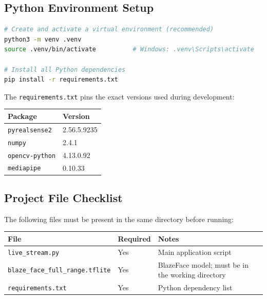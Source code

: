 \documentclass[12pt, a4paper]{article}
\newcommand{\code}[1]{\texttt{\small#1}}
\begin{document}
\subsection{Python Environment Setup}

\begin{lstlisting}[language=sh, caption={Create environment and install dependencies}]
# Create and activate a virtual environment (recommended)
python3 -m venv .venv
source .venv/bin/activate          # Windows: .venv\Scripts\activate

# Install all Python dependencies
pip install -r requirements.txt
\end{lstlisting}

The \code{requirements.txt} pins the exact versions used during development:

\begin{center}
\begin{tabular}{ll}
  \toprule
  \textbf{Package} & \textbf{Version} \\
  \midrule
  \code{pyrealsense2}  & 2.56.5.9235 \\
  \code{numpy}         & 2.4.1 \\
  \code{opencv-python} & 4.13.0.92 \\
  \code{mediapipe}     & 0.10.33 \\
  \bottomrule
\end{tabular}
\end{center}

\subsection{Project File Checklist}

The following files must be present in the same directory before running:

\begin{center}
\begin{tabular}{lll}
  \toprule
  \textbf{File} & \textbf{Required} & \textbf{Notes} \\
  \midrule
  \code{live\_stream.py}                  & Yes & Main application script \\
  \code{blaze\_face\_full\_range.tflite}  & Yes & BlazeFace model; must be in the working directory \\
  \code{requirements.txt}                 & Yes & Python dependency list \\
  \bottomrule
\end{tabular}
\end{center}
\end{document}
